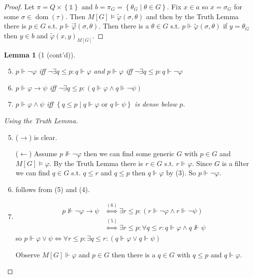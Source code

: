 \documentclass{scrartcl}
\newcommand{\set}[1]{\left\{#1\right\}}
\DeclareMathOperator{\dom}{dom}
\theoremstyle{definition}
\theoremstyle{plain}
\newtheorem*{lemma*}{Lemma}
\theoremstyle{remark}
\begin{document}
\begin{proof}
		Let $\pi = Q \times \set{\mathbb{1}}$ and $b = \pi_G = \set{\theta_G \mid \theta
		\in G}$. Fix $x \in a$ so $x = \sigma_G$ for some $\sigma \in \dom(\tau)$.
		Then $M[G] \vDash \tilde{\varphi}(\sigma, \theta)$ and then by the Truth
		Lemma there is $p \in G$ s.t. $p \Vdash \vec{\varphi}(\sigma, \theta)$.
		Then there is a $\theta \in G$ s.t. $p \Vdash \tilde{\varphi}(\sigma, \theta) $
		if $y = \theta_G$ then $y \in b$ and $\tilde\varphi(x,y)_{M[G]}$.
	\end{proof}

	\begin{lemma*}[1 (cont'd)]
		\begin{enumerate}[1.]
			\setcounter{enumi}{4}
			\item $p \Vdash \lnot \varphi $ iff $\lnot \exists q \leq p: q \Vdash \varphi $
			and $p \Vdash \varphi $ iff $\lnot \exists q \leq p: q \Vdash \lnot \varphi$
			
			\item $p \Vdash \varphi \longrightarrow \psi$ iff $\lnot \exists q \leq p: (q \Vdash \varphi \land 
			q \Vdash \lnot \psi)$

			\item $p \Vdash \varphi \land \psi$ iff $\set{q \leq p \mid q \Vdash
			\varphi \text{ or } q \Vdash \psi}$ is dense below $p$.
		\end{enumerate}
	\end{lemma*}

	\begin{proof}[Using the Truth Lemma]
		\begin{enumerate}[1.]
			\setcounter{enumi}{4}
			\item ($\longrightarrow$) is clear.

			($\longleftarrow$) Assume $p \nVdash \lnot \varphi$ then we can
			find some generic $G$ with $p \in G$ and $M[G] \vDash \varphi$. 
			By the Truth Lemma there is $r \in G$ s.t. $r\Vdash \varphi $.
			Since $G$ is a filter we can find $q \in G$ s.t. $q \leq r$ and
			$q \leq p$ then $q \Vdash \varphi $ by (3). So $p \Vdash \lnot \varphi$. 

			\item follows from (5) and (4).

			\item 
			\begin{align*}
				p \nVdash \lnot \varphi \longrightarrow \psi &\overset{(6)}\iff \exists r \leq p: 
			(r \Vdash \lnot \varphi \land r \Vdash \lnot \psi)\\
			&\overset{(5)}\iff \exists r \leq p: \forall q \leq r: q \Vdash \varphi  \land q \nVdash \psi    
			\end{align*}
			so $p \Vdash \varphi \lor \psi \iff \forall r \leq p: \exists q  \leq r: (
			q \Vdash \varphi \lor q \Vdash \psi)$

			Observe $M[G] \Vdash \varphi$ and $p \in G$ then there is a $q \in G$ with
			$q \leq p$ and $q \Vdash \varphi $.
		\end{enumerate}
	\end{proof}
\end{document}
